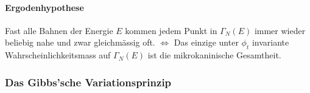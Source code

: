 \paragraph{Ergodenhypothese}
Fast alle Bahnen der Energie $E$ kommen jedem Punkt in $\Gamma_N (E)$ immer
wieder beliebig nahe und zwar gleichmässig oft. $\Leftrightarrow$ Das einzige
unter $\phi_t$ invariante Wahrscheinlichkeitsmass auf $\Gamma_N (E)$ ist
die mikrokaninische Gesamtheit.




\vspace{-5pt}

\subsubsection{Das Gibbs'sche Variationsprinzip}

